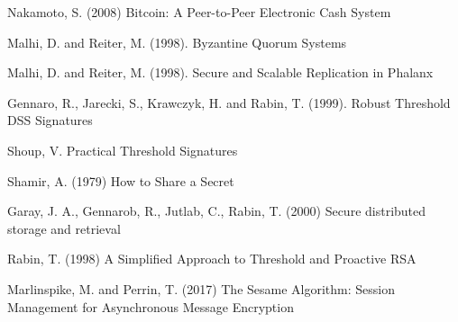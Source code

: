 \begin{thebibliography}{99}

  Nakamoto, S. (2008) Bitcoin: A Peer-to-Peer Electronic Cash System

  Malhi, D. and Reiter, M. (1998). Byzantine Quorum Systems

  Malhi, D. and Reiter, M. (1998). Secure and Scalable Replication in Phalanx

  Gennaro, R., Jarecki, S., Krawczyk, H. and Rabin, T. (1999). Robust
  Threshold DSS Signatures

  Shoup, V. Practical Threshold Signatures
  
  Shamir, A. (1979) How to Share a Secret

  Garay, J. A., Gennarob, R., Jutlab, C., Rabin, T. (2000)  Secure
  distributed storage and retrieval

  Rabin, T. (1998) A Simplified Approach to Threshold and Proactive RSA

  Marlinspike, M. and Perrin, T. (2017) The Sesame Algorithm: Session Management for Asynchronous Message Encryption

\end{thebibliography}
